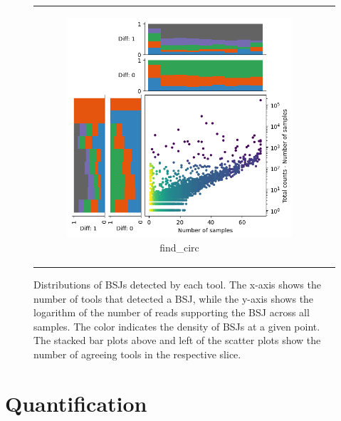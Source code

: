 \begin{figure}[ht]
\begin{tabular}{cc}
\begin{subfigure}{.5\textwidth}
            \includegraphics[width=\linewidth]{chapters/4_results_and_discussion/figures/detection/density/find_circ.png}
            \caption{find\_circ}
            \label{fig:detection_density_find-circ}
        \end{subfigure}
    \end{tabular}
    \caption{Distributions of BSJs detected by each tool.
        The x-axis shows the number of tools that detected a BSJ, while the y-axis
        shows the logarithm of the number of reads supporting the BSJ across all
        samples.
        The color indicates the density of BSJs at a given point.
        The stacked bar plots above and left of the scatter plots show the number of
        agreeing tools in the respective slice.
    }
    \label{fig:detection_density}
\end{figure}

\section{Quantification}

